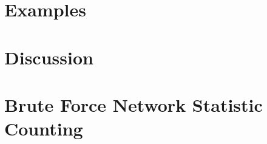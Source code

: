 \documentclass[oneside]{myumnStatThesis}
\begin{document}
\chapter{Examples} \label{S:Examples}


\chapter{Discussion}



%

%

\appendix
\chapter{Brute Force Network Statistic Counting} \label{Section:Count Triangles}

\end{document}

